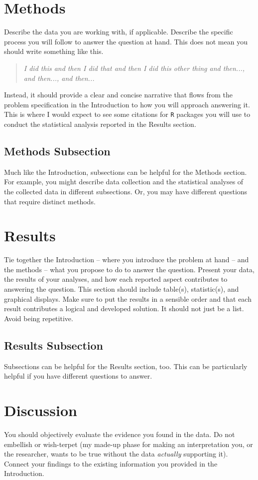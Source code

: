\documentclass{article}\usepackage[]{graphicx}\usepackage[]{xcolor}
\begin{document}
\begin{multicols}{2}
\section{Methods}
Describe the data you are working with, if applicable. Describe the specific process you will follow to answer the question at hand. This does not mean you should write something like this.
\begin{quote}
\textit{I did this and then I did that and then I did this other thing and then..., and then..., and then...}
\end{quote}
Instead, it should provide a clear and concise narrative that flows from the problem specification in the Introduction to how you will approach answering it. This is where I would expect to see some citations for \texttt{R} packages you will use to conduct the statistical analysis reported in the Results section.


\subsection{Methods Subsection}
Much like the Introduction, subsections can be helpful for the Methods section. For example, you might describe data collection and the statistical analyses of the collected data in different subsections. Or, you may have different questions that require distinct methods. 

\section{Results}
Tie together the Introduction -- where you introduce the problem at hand -- and the methods --  what you propose to do to answer the question. Present your data, the results of your analyses, and how each reported aspect contributes to answering the question. This section should include table(s), statistic(s), and graphical displays. Make sure to put the results in a sensible order and that each result contributes a logical and developed solution. It should not just be a list. Avoid being repetitive. 

\subsection{Results Subsection}
Subsections can be helpful for the Results section, too. This can be particularly helpful if you have different questions to answer. 


\section{Discussion}
 You should objectively evaluate the evidence you found in the data. Do not embellish or wish-terpet (my made-up phase for making an interpretation you, or the researcher, wants to be true without the data \emph{actually} supporting it). Connect your findings to the existing information you provided in the Introduction.


\end{multicols}
\end{document}

